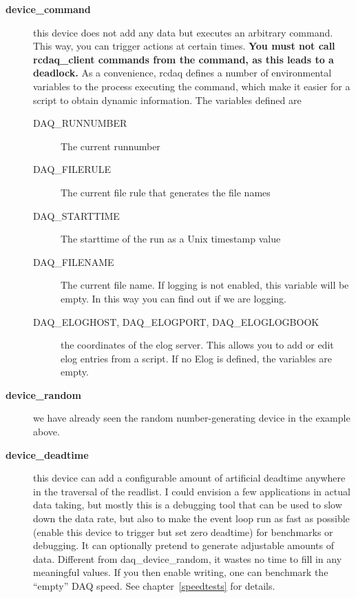 \documentclass{article}[11pt]
\begin{document}
\begin{description}
\item[\bf device\_command] this device does not add any data but executes
  an arbitrary command.  This way, you can trigger actions at certain
  times.  {\bf You must not call rcdaq\_client commands from the
    command, as this leads to a deadlock.} As a convenience, rcdaq
  defines a number of environmental variables to the process executing
  the command, which make it easier for a script to obtain dynamic
  information. The variables defined are \label{environment}
  \begin{description}
  \item[DAQ\_RUNNUMBER] The current runnumber
    
  \item[DAQ\_FILERULE]  The current file rule that generates the file names 
    
  \item[DAQ\_STARTTIME] The starttime of the run as a Unix timestamp value
    
  \item[DAQ\_FILENAME] The current file name. If logging is not
    enabled, this variable will be empty. In this way you can find out
    if we are logging.
    
  \item[DAQ\_ELOGHOST, DAQ\_ELOGPORT, DAQ\_ELOGLOGBOOK] the coordinates
    of the elog server. This allows you to add or edit elog entries
    from a script. If no Elog is defined, the variables are empty. 
  \end{description}

\item[\bf device\_random] we have already seen the random
  number-generating device in the example above.

\item[\bf device\_deadtime] this device can add a configurable amount
  of artificial deadtime anywhere in the traversal of the readlist.  I
  could envision a few applications in actual data taking, but mostly
  this is a debugging tool that can be used to slow down the data
  rate, but also to make the event loop run as fast as possible
  (enable this device to trigger but set zero deadtime) for benchmarks
  or debugging. It can optionally pretend to generate adjustable
  amounts of data. Different from daq\_device\_random, it wastes no
  time to fill in any meaningful values. If you then enable writing,
  one can benchmark the ``empty'' DAQ speed. See
  chapter~\ref{speedtests} for details.


\end{description}
\end{document}
